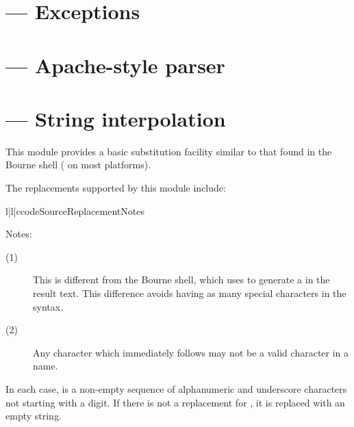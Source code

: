 \documentclass{howto}
\begin{document}


\section{ --- Exceptions}



\section{ --- Apache-style parser}



\section{ --- String interpolation}


This module provides a basic substitution facility similar to that
found in the Bourne shell ( on most \UNIX{} platforms).  

The replacements supported by this module include:

\begin{tableiii}{l|l|c}{code}{Source}{Replacement}{Notes}
\end{tableiii}

\noindent
Notes:
\begin{description}
  \item[(1)]  This is different from the Bourne shell, which uses
              \code{\textbackslash\$} to generate a \character{\$} in
              the result text.  This difference avoids having as many
              special characters in the syntax.

  \item[(2)]  Any character which immediately follows  may
              not be a valid character in a name.
\end{description}

In each case,  is a non-empty sequence of alphanumeric and
underscore characters not starting with a digit.  If there is not
a replacement for , it is replaced with an empty string.
\end{document}
